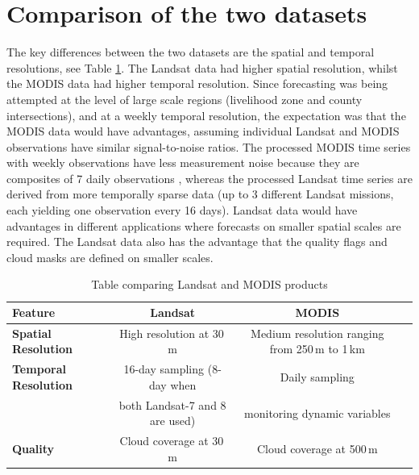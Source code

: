\documentclass[review]{elsarticle}
\begin{document}

\appendix

\section{Comparison of the two datasets}
The key differences between the two datasets are the spatial and temporal resolutions, see Table \ref{tab:comp}. The Landsat data had higher spatial resolution, whilst the MODIS data had higher temporal resolution. Since forecasting was being attempted at the level of large scale regions (livelihood zone and county intersections), and at a weekly temporal resolution, the expectation was that the MODIS data would have advantages,  assuming individual Landsat and MODIS observations have similar signal-to-noise ratios. The processed MODIS time series with weekly observations have less measurement noise because they are composites of 7 daily observations , whereas the processed Landsat time series are derived from more temporally sparse data (up to 3 different Landsat missions, each yielding one observation every 16 days). Landsat data would have advantages in different applications where forecasts on smaller spatial scales are required. The Landsat data also has the advantage that the quality flags and cloud masks are defined on smaller scales.    



\begin{table}
	\small
	\caption{Table comparing Landsat and MODIS products}
	\label{tab:comp}
	\centering
	\begin{tabular}{lccc}
		\toprule
		\textbf{Feature}	& \textbf{Landsat} & \textbf{MODIS}\\
		\midrule
		\textbf{Spatial Resolution} & 	High resolution at 30\,m 	&   Medium resolution ranging from 250\,m to 1\,km \\
		\textbf{Temporal Resolution}	&  16-day sampling (8-day when	&   Daily sampling    \\ 
		&  both Landsat-7 and 8 are used) & monitoring dynamic variables \\
		\textbf{Quality} &Cloud coverage at 30\,m & Cloud coverage at 500\,m \\
		
		\bottomrule
	\end{tabular}
\end{table}
\end{document}
